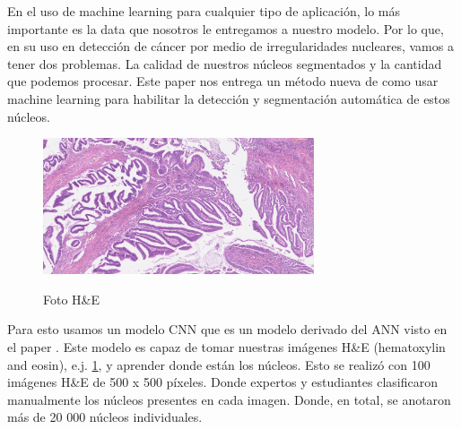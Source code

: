 \documentclass[12pt, letterpaper]{article}
\begin{document}
En el uso de machine learning para cualquier tipo de aplicación, lo más importante es la data que nosotros le entregamos a nuestro modelo. Por lo que, en su uso en detección de cáncer por medio de irregularidades nucleares, vamos a tener dos problemas. La calidad de nuestros núcleos segmentados y la cantidad que podemos procesar. Este paper nos entrega un método nueva de como usar machine learning para habilitar la detección y segmentación automática de estos núcleos. 


\begin{figure}[h]
\centering
	\includegraphics[width=8cm]{hm-stain-sirinukunwattanaLocalitySensitiveDeep2016.png}
	\caption{Foto H\&E}
	\autocite{kourouMachineLearningApplications2015}
	\label{fig: hm-stain}
\end{figure}

Para esto usamos un modelo CNN que es un modelo derivado del ANN visto en el paper \autocite{kourouMachineLearningApplications2015}. Este modelo es capaz de tomar nuestras imágenes H\&E (hematoxylin and eosin), e.j. \cref{fig: hm-stain}, y aprender donde están los núcleos. Esto se realizó con 100 imágenes H\&E de 500 x 500 píxeles. Donde expertos y estudiantes clasificaron manualmente los núcleos presentes en cada imagen. Donde, en total, se anotaron más de 20 000 núcleos individuales.
\end{document}
